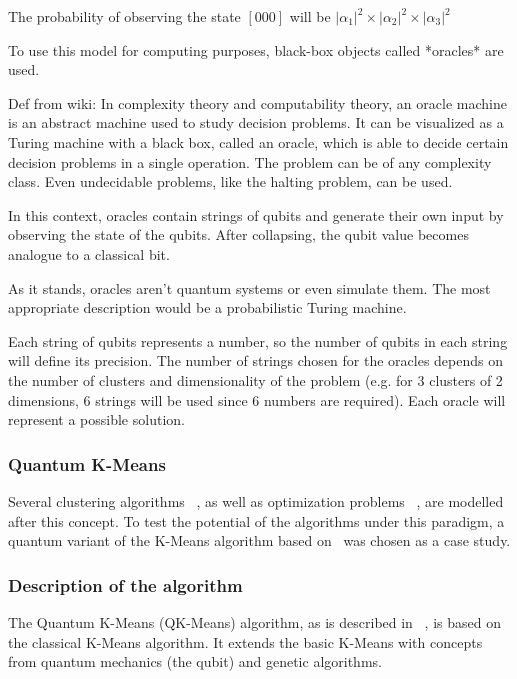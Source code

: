The probability of observing the state $[000]$ will be $|\alpha_1|^2 \times |\alpha_2|^2 \times |\alpha_3|^2$

To use this model for computing purposes, black-box objects called *oracles* are used.


Def from wiki: In complexity theory and computability theory, an oracle machine is an abstract machine used to study decision problems. It can be visualized as a Turing machine with a black box, called an oracle, which is able to decide certain decision problems in a single operation. The problem can be of any complexity class. Even undecidable problems, like the halting problem, can be used. %

In this context, oracles contain strings of qubits and generate their own input by observing the state of the qubits. After collapsing, the qubit value becomes analogue to a classical bit.



As it stands, oracles aren't quantum systems or even simulate them. The most appropriate description would be a probabilistic Turing machine.

Each string of qubits represents a number, so the number of qubits in each string will define its precision. The number of strings chosen for the oracles depends on the number of clusters and dimensionality of the problem (e.g. for 3 clusters of 2 dimensions, 6 strings will be used since 6 numbers are required). Each oracle will represent a possible solution.


\subsubsection{Quantum K-Means}

Several clustering algorithms ~\cite{Casper2013,Casper,Xiao2010}, as well as optimization problems ~\cite{Wang2013}, are modelled after this concept. To test the potential of the algorithms under this paradigm, a quantum variant of the K-Means algorithm based on~\cite{Casper} was chosen as a case study.

\subsubsection{Description of the algorithm}

The Quantum K-Means (QK-Means) algorithm, as is described in ~\cite{Casper}, is based on the classical K-Means algorithm. It extends the basic K-Means with concepts from quantum mechanics (the qubit) and genetic algorithms.

